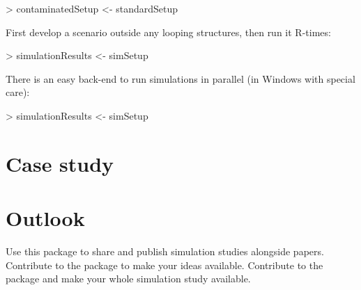 \documentclass[article]{ajs}
\begin{document}
\begin{Schunk}
\begin{Sinput}
> contaminatedSetup <- standardSetup %
\end{Sinput}
\end{Schunk}

First develop a scenario outside any looping structures, then run it R-times:

\begin{Schunk}
\begin{Sinput}
> simulationResults <- simSetup %
\end{Sinput}
\end{Schunk}

There is an easy back-end to run simulations in parallel (in Windows with special care):

\begin{Schunk}
\begin{Sinput}
> simulationResults <- simSetup %
\end{Sinput}
\end{Schunk}


\section{Case study}

\section{Outlook}
Use this package to share and publish simulation studies alongside papers. Contribute to the package to make your ideas available. Contribute to the package and make your whole simulation study available. 


%

\end{document}
